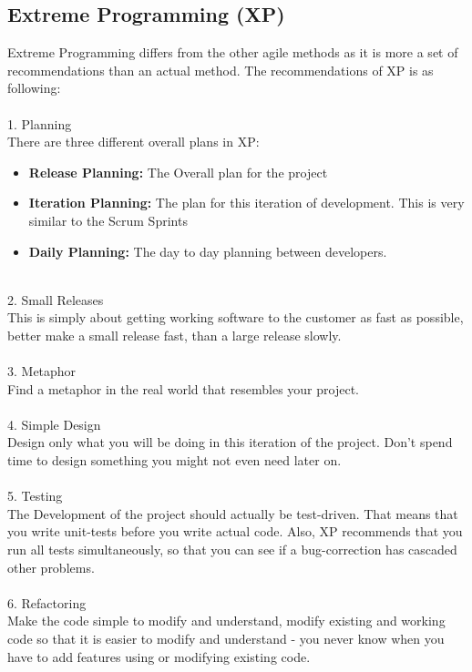 \subsection{Extreme Programming (XP)}
Extreme Programming differs from the other agile methods as it is more a set of recommendations than an actual method. The recommendations of XP is as following:\\
\ \\
1. Planning\\
There are three different overall plans in XP:
\begin{itemize}
	\item \textbf{Release Planning:} The Overall plan for the project
	\item \textbf{Iteration Planning:} The plan for this iteration of development. This is very similar to the Scrum Sprints
	\item \textbf{Daily Planning:} The day to day planning between developers.
\end{itemize}
\ \\
2. Small Releases\\
This is simply about getting working software to the customer as fast as possible, better make a small release fast, than a large release slowly.\\
 \\
3. Metaphor\\
Find a metaphor in the real world that resembles your project.\\
 \\
4. Simple Design\\
Design only what you will be doing in this iteration of the project. Don't spend time to design something you might not even need later on.\\
 \\
5. Testing\\
The Development of the project should actually be test-driven. That means that you write unit-tests before you write actual code. Also, XP recommends that you run all tests simultaneously, so that you can see if a bug-correction has cascaded other problems.\\
 \\
6. Refactoring\\
Make the code simple to modify and understand, modify existing and working code so that it is easier to modify and understand - you never know when you have to add features using or modifying existing code.\\
 \\
